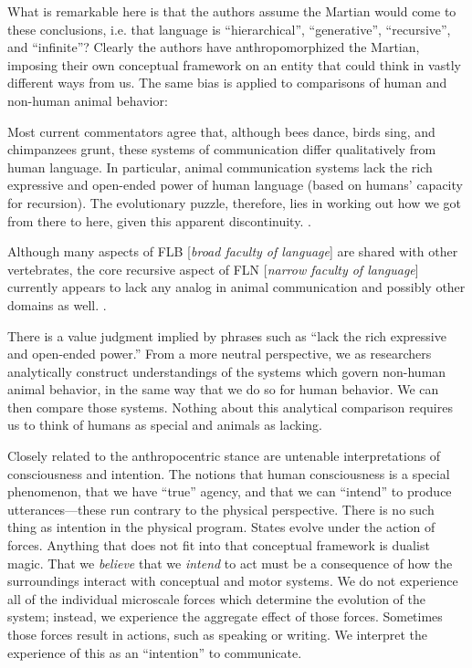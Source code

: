   What is remarkable here is that the authors assume the Martian would come to these conclusions, i.e. that language is “hierarchical”, “generative”, “recursive”, and “infinite”? Clearly the authors have anthropomorphized the Martian, imposing their own conceptual framework on an entity that could think in vastly different ways from us. The same bias is applied to comparisons of human and non-human animal behavior:

Most current commentators agree that, although bees dance, birds sing, and chimpanzees grunt, these systems of communication differ qualitatively from human language. In particular, animal communication systems lack the rich expressive and open-ended power of human language (based on humans' capacity for recursion). The evolutionary puzzle, therefore, lies in working out how we got from there to here, given this apparent discontinuity. \citep{HauserEtAl2002}.

Although many aspects of FLB [\textit{broad faculty of language}] are shared with other vertebrates, the core recursive aspect of FLN [\textit{narrow faculty of language}] currently appears to lack any analog in animal communication and possibly other domains as well. \citep{HauserEtAl2002}.

  There is a value judgment implied by phrases such as “lack the rich expressive and open-ended power.” From a more neutral perspective, we as researchers analytically construct understandings of the systems which govern non-human animal behavior, in the same way that we do so for human behavior. We can then compare those systems. Nothing about this analytical comparison requires us to think of humans as special and animals as lacking.

  Closely related to the anthropocentric stance are untenable interpretations of consciousness and intention. The notions that human consciousness is a special phenomenon, that we have “true” agency, and that we can “intend” to produce utterances—these run contrary to the physical perspective. There is no such thing as intention in the physical program. States evolve under the action of forces. Anything that does not fit into that conceptual framework is dualist magic. That we \textit{believe} that we \textit{intend} to act must be a consequence of how the surroundings interact with conceptual and motor systems. We do not experience all of the individual microscale forces which determine the evolution of the system; instead, we experience the aggregate effect of those forces.  Sometimes those forces result in actions, such as speaking or writing. We interpret the experience of this as an “intention” to communicate.

